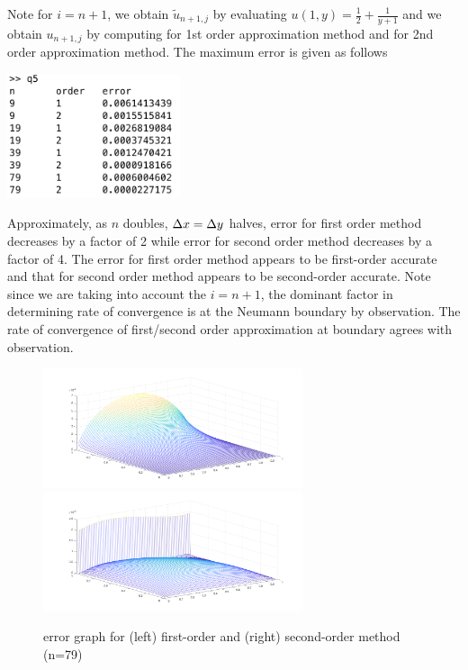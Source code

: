 \documentclass[11pt]{article}
\begin{document}
Note for $i=n+1$, we obtain $\tilde{u}_{n+1,j}$ by evaluating $\textstyle u(1, y) = \frac{1}{2} + \frac{1}{y+1}$ and we obtain $u_{n+1,j}$ by computing \bheading{\ref{eq1}} for 1st order approximation method and \bheading{\ref{eq2}} for 2nd order approximation method. The maximum error is given as follows
\begin{center}
    \includegraphics[width=2in]{q5output}
\end{center}
Approximately, as $n$ doubles, $\Delta x=\Delta y$ halves, error for first order method decreases by a factor of 2 while error for second order method decreases by a factor of 4. The error for first order method appears to be first-order accurate and that for second order method appears to be second-order accurate. Note since we are taking into account the $i=n+1$, the dominant factor in determining rate of convergence is at the Neumann boundary by observation. The rate of convergence of first/second order approximation at boundary agrees with observation.
\begin{figure}[ht]
    \begin{center}
        \includegraphics[width=3in]{q5_od_1} 
        \includegraphics[width=3in]{q5_od_2}
        \caption{error graph for (left) first-order and (right) second-order method (n=79)}
    \end{center}
\end{figure}
\end{document}
